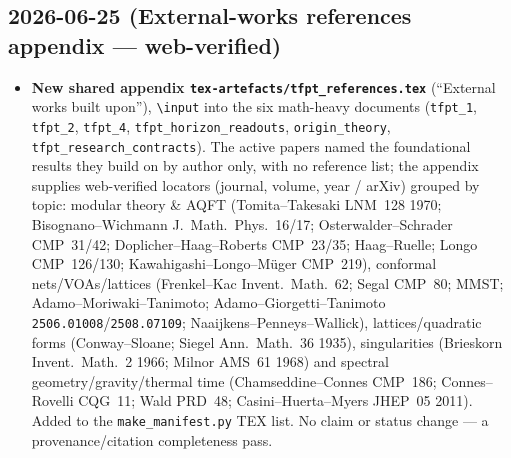 \documentclass[11pt]{article}
\begin{document}
\subsection*{2026-06-25 (External-works references appendix --- web-verified)}
\begin{itemize}
\item \textbf{New shared appendix \texttt{tex-artefacts/tfpt\_references.tex}} (``External works built
upon''), \texttt{\textbackslash input} into the six math-heavy documents (\texttt{tfpt\_1},
\texttt{tfpt\_2}, \texttt{tfpt\_4}, \texttt{tfpt\_horizon\_readouts}, \texttt{origin\_theory},
\texttt{tfpt\_research\_contracts}). The active papers named the foundational results they build on by
author only, with no reference list; the appendix supplies web-verified locators (journal, volume, year /
arXiv) grouped by topic: modular theory \& AQFT (Tomita--Takesaki LNM~128 1970; Bisognano--Wichmann
J.~Math.\ Phys.\ 16/17; Osterwalder--Schrader CMP~31/42; Doplicher--Haag--Roberts CMP~23/35;
Haag--Ruelle; Longo CMP~126/130; Kawahigashi--Longo--M\"uger CMP~219), conformal nets/VOAs/lattices
(Frenkel--Kac Invent.~Math.~62; Segal CMP~80; MMST; Adamo--Moriwaki--Tanimoto; Adamo--Giorgetti--Tanimoto
\texttt{2506.01008}/\texttt{2508.07109}; Naaijkens--Penneys--Wallick), lattices/quadratic forms
(Conway--Sloane; Siegel Ann.~Math.~36 1935), singularities (Brieskorn Invent.~Math.~2 1966; Milnor AMS~61
1968) and spectral geometry/gravity/thermal time (Chamseddine--Connes CMP~186; Connes--Rovelli CQG~11;
Wald PRD~48; Casini--Huerta--Myers JHEP~05 2011). Added to the \texttt{make\_manifest.py} TEX list. No
claim or status change --- a provenance/citation completeness pass.
\end{itemize}
\end{document}
